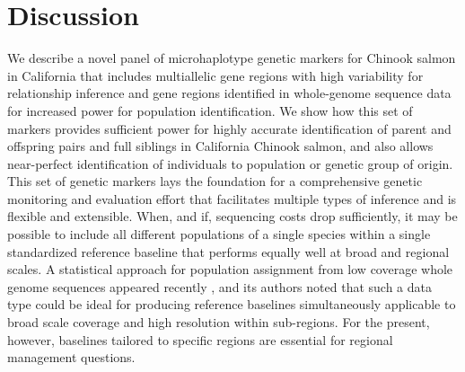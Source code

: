 \section*{Discussion}

We describe a novel panel of microhaplotype genetic markers for Chinook salmon 
in California that includes multiallelic gene regions with high variability for 
relationship inference and gene regions identified in whole-genome sequence data 
for increased power for population identification. We show how this set of markers
provides sufficient power for highly accurate identification of parent and offspring
pairs and full siblings in California Chinook salmon, and also allows near-perfect 
identification of individuals to population or genetic group of origin. This set of 
genetic markers lays the foundation for a comprehensive genetic monitoring and evaluation effort
that facilitates multiple types of inference and is flexible and extensible.
When, and if, sequencing costs drop sufficiently, it may be possible to include
all different populations of a single species within a single standardized reference baseline
that performs equally well at broad and regional scales. A statistical approach for population
assignment from low coverage whole genome sequences appeared recently
\citep{desaixINPRESSpopulation}, and its authors noted that such a data type could
be ideal for producing reference baselines simultaneously applicable to broad scale
coverage and high resolution within sub-regions.   For the present, however,
baselines tailored to specific regions are essential for regional management questions.

